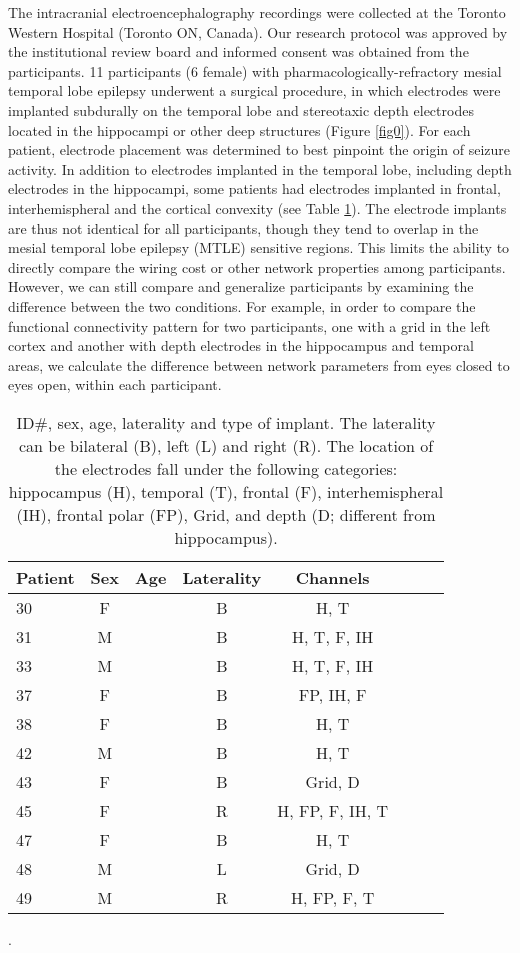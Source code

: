 \documentclass[11pt, onecolumn]{article}
\begin{document}
The intracranial electroencephalography recordings were collected at the Toronto Western Hospital (Toronto ON, Canada). Our research protocol was approved by the institutional review board and informed consent was obtained from the participants. 11 participants (6 female) with pharmacologically-refractory mesial temporal lobe epilepsy underwent a surgical procedure, in which electrodes were implanted subdurally on the temporal lobe and stereotaxic depth electrodes located in the hippocampi or other deep structures (Figure \ref{fig0}).
For each patient, electrode placement was determined to
best pinpoint the origin of seizure activity. In addition to electrodes implanted in the temporal lobe, including depth electrodes in the hippocampi, some patients had electrodes implanted in frontal, interhemispheral and the cortical convexity (see Table \ref{Table:demog}). The electrode implants are thus not identical for all participants, though they tend to overlap in the mesial temporal lobe epilepsy (MTLE) sensitive regions. This limits the ability to directly compare the wiring cost or other network properties among participants. However, we can still compare and generalize participants by examining the difference between the two conditions. For example, in order to compare the functional connectivity pattern for two participants, one with a grid in the left cortex and another with depth electrodes in the hippocampus and temporal areas, we calculate the difference between network parameters from eyes closed to eyes open, within each participant.

\begin{table}
\centering
\begin{tabular}{l*{6}{c}r}
Patient & Sex & Age & Laterality & Channels  \\
\hline
30 & F &  & B & H, T \\
31 & M &  & B & H, T, F, IH \\
33 & M &  & B & H, T, F, IH \\
37 & F &  & B & FP, IH, F  \\
38 & F &  & B & H, T \\
42 & M &  & B & H, T  \\ %
43 & F &  & B & Grid, D \\%
45 & F &  & R & H, FP, F, IH, T   \\
47 & F &  & B & H, T  \\
48 & M &  & L & Grid, D \\ %
49 & M &  & R & H, FP, F, T   \\
\end{tabular}
\caption{\label{Table:demog} ID#, sex, age, laterality and type of implant. 
The laterality can be bilateral (B), left (L) and right (R).  The location of the electrodes fall under the following categories: hippocampus (H), temporal (T), frontal (F),  interhemispheral (IH), frontal  polar (FP),  Grid, and depth  (D; different from hippocampus).}.
\end{table}
\end{document}
